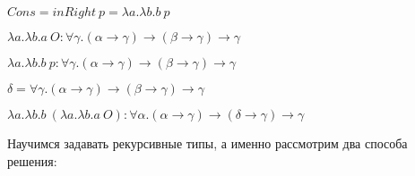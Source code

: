 $Cons = inRight\ p = \lambda a. \lambda b. b\ p$

$\lambda a. \lambda b. a\ O : \forall \gamma .(\alpha \rightarrow \gamma) \rightarrow (\beta \rightarrow \gamma) \rightarrow \gamma$

$\lambda a. \lambda b. b\ p: \forall \gamma .(\alpha \rightarrow \gamma) \rightarrow (\beta \rightarrow \gamma) \rightarrow \gamma$

$\delta = \forall \gamma .(\alpha \rightarrow \gamma) \rightarrow (\beta \rightarrow \gamma) \rightarrow \gamma$

$\lambda a. \lambda b. b\ (\lambda a. \lambda b. a\ O) : \forall \alpha. (\alpha \rightarrow \gamma) \rightarrow (\delta \rightarrow \gamma) \rightarrow \gamma$


\vspace{5mm}
Научимся задавать рекурсивные типы, а именно рассмотрим два способа решения:

